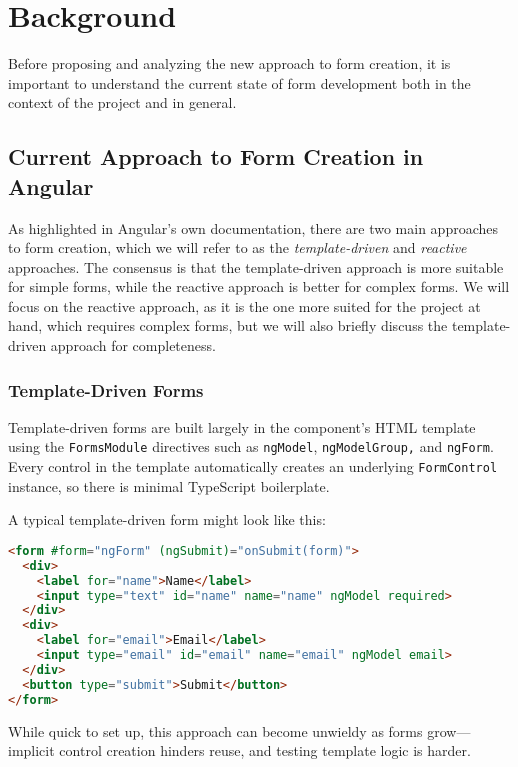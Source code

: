 \usepackage{listings}
\section{Background}

Before proposing and analyzing the new approach to form creation, it is important to understand the current state of
form development both in the context of the project and in general.

\subsection{Current Approach to Form Creation in Angular}

As highlighted in Angular's own documentation\cite{Angular:forms}, there are two main approaches to form creation, which
we will refer to as the \textit{template-driven} and \textit{reactive} approaches.
The consensus is that the template-driven approach is more suitable for simple forms, while the reactive approach is
better for complex forms.
We will focus on the reactive approach, as it is the one more suited for the project at hand, which requires complex
forms, but we will also briefly discuss the template-driven approach for completeness.

\subsubsection{Template-Driven Forms}

Template-driven forms are built largely in the component’s HTML template using the \texttt{FormsModule} directives such
as \texttt{ngModel}, \texttt{ngModelGroup,} and \texttt{ngForm}.
Every control in the template automatically creates an underlying \texttt{FormControl} instance, so there is minimal
TypeScript boilerplate.

A typical template-driven form might look like this:
\begin{lstlisting}[language=HTML,caption={Template-Driven Form HTML}, label={lst:templateHTML}]
<form #form="ngForm" (ngSubmit)="onSubmit(form)">
  <div>
    <label for="name">Name</label>
    <input type="text" id="name" name="name" ngModel required>
  </div>
  <div>
    <label for="email">Email</label>
    <input type="email" id="email" name="email" ngModel email>
  </div>
  <button type="submit">Submit</button>
</form>
\end{lstlisting}

While quick to set up, this approach can become unwieldy as forms grow—implicit control creation hinders reuse, and
testing template logic is harder.

